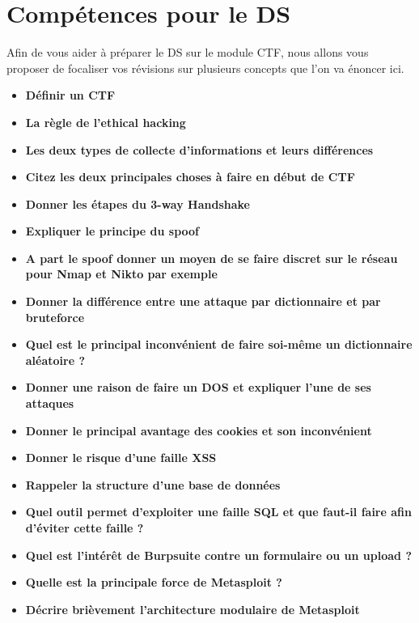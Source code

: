 \chapter{Compétences pour le DS}

\vspace{-1.1cm}

\noindent Afin de vous aider à préparer le DS sur le module CTF, nous allons vous proposer de focaliser vos révisions sur plusieurs concepts que l'on va énoncer ici.

\begin{itemize}
    \item \textbf{Définir un CTF}
    \item \textbf{La règle de l'ethical hacking}
    \item \textbf{Les deux types de collecte d'informations et leurs différences}
    \item \textbf{Citez les deux principales choses à faire en début de CTF}
    \item \textbf{Donner les étapes du 3-way Handshake}
    \item \textbf{Expliquer le principe du spoof}
    \item \textbf{A part le spoof donner un moyen de se faire discret sur le réseau pour Nmap et Nikto par exemple}
    \item \textbf{Donner la différence entre une attaque par dictionnaire et par bruteforce}
    \item \textbf{Quel est le principal inconvénient de faire soi-même un dictionnaire aléatoire ?}
    \item \textbf{Donner une raison de faire un DOS et expliquer l'une de ses attaques}
    \item \textbf{Donner le principal avantage des cookies et son inconvénient}
    \item \textbf{Donner le risque d'une faille XSS}
    \item \textbf{Rappeler la structure d'une base de données}
    \item \textbf{Quel outil permet d'exploiter une faille SQL et que faut-il faire afin d'éviter cette faille ?}
    \item \textbf{Quel est l'intérêt de Burpsuite contre un formulaire ou un upload ?}
    \item \textbf{Quelle est la principale force de Metasploit ?}
    \item \textbf{Décrire brièvement l'architecture modulaire de Metasploit}

\end{itemize}
